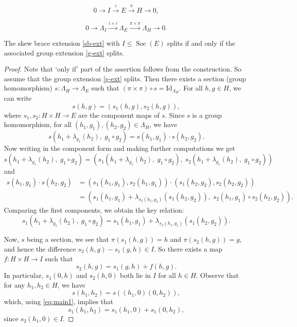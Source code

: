 \documentclass[10pt,a4paper]{amsart}
\newcommand{\Soc}{\operatorname{Soc} }
\begin{document}
\begin{equation}\label{sb-ext}
0 \longrightarrow I \xrightarrow{i} E \xrightarrow{\pi} H \longrightarrow 0,
\end{equation}

\begin{equation}\label{g-ext}
0 \longrightarrow \Lambda_I  \xrightarrow{i \times i} \Lambda_E \xrightarrow{\pi \times \pi} \Lambda_H \longrightarrow 0.
\end{equation}

\begin{thm}\label{prop-split-ext}
	The skew brace extension \eqref{sb-ext}  with $I \le \Soc(E)$ splits if and only if  the associated group extension \eqref{g-ext} splits.
\end{thm}

\begin{proof}
Note that `only if' part of the assertion follows from the construction.  So assume that the group extension \eqref{g-ext} splits. Then there exists a section (group homomorphism) 
$s : \Lambda_H \to \Lambda_E$ such that  \( (\pi \times \pi) \circ s = \mathrm{Id}_{\Lambda_H} \). For all \( h, g \in H \), we can write
$$
s(h, g) = (s_1(h, g), s_2(h, g)),$$
where \( s_1, s_2 : H \times H \to E \) are the component maps of $s$.
Since \( s \) is a group homomorphism, for all \( (h_1, g_1), (h_2, g_2) \in \Lambda_H \), we have
$$s(h_1 + \lambda_{g_1}(h_2),\; g_1 \circ g_2) = s(h_1, g_1) \cdot s(h_2, g_2).$$
Now writing in the  component form and making further computations we get
$$s(h_1 + \lambda_{g_1}(h_2),\; g_1 \circ g_2) = (s_1(h_1 + \lambda_{g_1}(h_2),\; g_1 \circ g_2),\; s_2(h_1 + \lambda_{g_1}(h_2),\; g_1 \circ g_2)) $$
and 
\begin{align*}
s(h_1, g_1) \cdot s(h_2, g_2)  &= (s_1(h_1, g_1), s_2(h_1, g_1)) \cdot (s_1(h_2, g_2), s_2(h_2, g_2)) \\
		&= \left(s_1(h_1, g_1) + \lambda_{s_2(h_1, g_1)}(s_1(h_2, g_2)),\; s_2(h_1, g_1) \circ s_2(h_2, g_2)\right).
	\end{align*}
	Comparing the first components, we obtain the key relation:
	\begin{equation}\label{eq:main1}
		s_1(h_1 + \lambda_{g_1}(h_2),\; g_1 \circ g_2) = s_1(h_1, g_1) + \lambda_{s_2(h_1, g_1)}(s_1(h_2, g_2)).
	\end{equation}
	
	Now, $s$ being a section, we see that \( \pi(s_1(h, g)) = h \) and \( \pi(s_2(h, g)) = g \), and hence the difference \( s_2(h, g) - s_1(g, h) \in I \). So there exists a  map \( f : H \times H \to I \) such that 
		\[
	s_2(h, g) = s_1(g, h) + f(h, g).
	\]
 In particular, $s_1(0, h)$ and $s_2(h, 0)$ both lie in $I$ for all $h \in H$. Observe that for any $h_1, h_2 \in H$, we have
	\[
	s(h_1, h_2) = s((h_1, 0)(0, h_2)),
	\]
	which, using \eqref{eq:main1},  implies that
	\begin{equation}\label{eq:addsplit}
		s_1(h_1, h_2) = s_1(h_1, 0) + s_1(0, h_2),
	\end{equation}
	since $s_2(h_1, 0) \in I$.


\end{proof}
\end{document}
